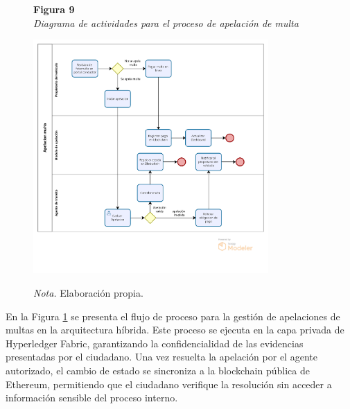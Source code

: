  \begin{figure}[htbp]
    \begin{flushleft}
        \textbf{Figura 9}\\[2em]
        \textit{Diagrama de actividades para el proceso de apelación de multa}
    \end{flushleft}
    \vspace{1em}
    \centering
    \includegraphics[width=0.8\textwidth]{Images/ActApelacion.png}
    \vspace{2em}
    \begin{flushleft}
        \textit{Nota.} Elaboración propia.
    \end{flushleft}
    \label{fig:diagrama_apelacion}
\end{figure}

En la Figura \ref{fig:diagrama_apelacion} se presenta el flujo de proceso para la gestión de apelaciones de multas en la arquitectura híbrida. Este proceso se ejecuta en la capa privada de Hyperledger Fabric, garantizando la confidencialidad de las evidencias presentadas por el ciudadano. Una vez resuelta la apelación por el agente autorizado, el cambio de estado se sincroniza a la blockchain pública de Ethereum, permitiendo que el ciudadano verifique la resolución sin acceder a información sensible del proceso interno.

